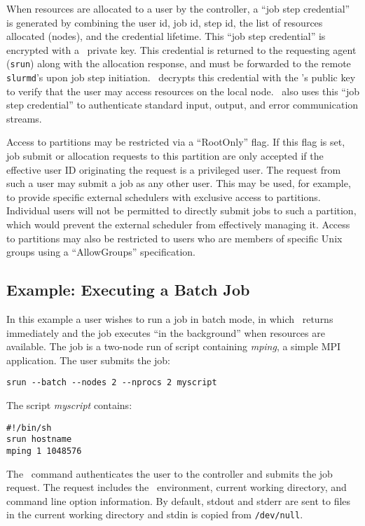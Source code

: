 When resources are allocated to a user by the controller, a ``job 
step credential'' is generated by combining the user id, job id, 
step id, the list of resources allocated (nodes), and the credential
lifetime. This ``job step credential'' is encrypted with 
a \slurmctld\ private key. This credential 
is returned to the requesting agent ({\tt srun}) along with the
allocation response, and must be forwarded to the remote {\tt slurmd}'s 
upon job step initiation. \slurmd\ decrypts this credential with the
\slurmctld 's public key to verify that the user may access
resources on the local node. \slurmd\ also uses this ``job step credential'' 
to authenticate standard input, output, and error communication streams. 

Access to partitions may be restricted via a ``RootOnly'' flag.  
If this flag is set, job submit or allocation requests to this 
partition are only accepted if the effective user ID originating 
the request is a privileged user. 
The request from such a user may submit a job as any other user. 
This may be used, for example, to provide specific external schedulers
with exclusive access to partitions.  Individual users will not be 
permitted to directly submit jobs to such a partition, which would 
prevent the external scheduler from effectively managing it.  
Access to partitions may also be restricted to users who are 
members of specific Unix groups using a ``AllowGroups'' specification.

\subsection{Example:  Executing a Batch Job}

In this example a user wishes to run a job in batch mode, in which \srun\ returns 
immediately and the job executes ``in the background'' when resources
are available.
The job is a two-node run of script containing {\em mping}, a simple MPI application.
The user submits the job:
\begin{verbatim}
srun --batch --nodes 2 --nprocs 2 myscript
\end{verbatim}
The script {\em myscript} contains:
\begin{verbatim}
#!/bin/sh
srun hostname
mping 1 1048576
\end{verbatim}

The \srun\ command authenticates the user to the controller and submits
the job request. 
The request includes the \srun\ environment, current working directory, 
and command line option information. By default, stdout and stderr are
sent to files in the current working directory and stdin is copied from
{\tt /dev/null}.

